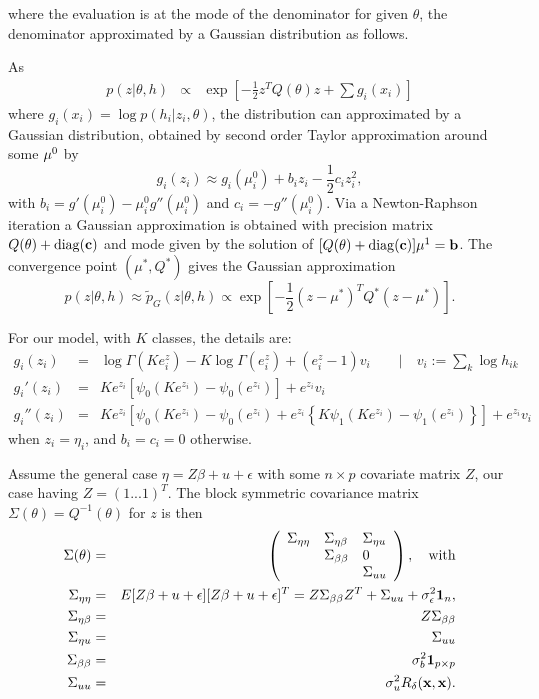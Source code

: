 \documentclass[10pt, onecolumn]{article}
\newcommand{\x}{z}
\newcommand{\y}{h}
\begin{document}
where the evaluation is at the mode of the denominator for given $\theta$, the denominator approximated by a Gaussian distribution as follows.

As
\begin{eqnarray}
p(\x | \theta, \y)&\propto& \exp \left[-\frac{1}{2}\x^T Q(\theta)\x + \sum g_i(x_i) \right]
\end{eqnarray}
where $g_i(x_i)=\log p(h_i|\x_i,\theta)$, the distribution can approximated by a Gaussian distribution, obtained by second order Taylor approximation around some $\bold\mu^0$ by
\[
g_i(\x_i)\approx g_i(\mu_i^0) + b_i \x_i - \frac{1}{2}c_i \x_i^2,
\]
with $b_i = g'(\mu_i^0)- \mu_i^0 g''(\mu_i^0)$ and $c_i=-g''(\mu_i^0)$. Via a Newton-Raphson iteration a Gaussian approximation is obtained with precision matrix $Q(\theta)+\mathrm{diag}(\bold c)$ and mode given by the solution of $[Q(\theta) + \mathrm{diag}(\bold c)]\bold\mu^1=\bold b$. 
The convergence point $(\mu^*, Q^*)$ gives the Gaussian approximation
\begin{equation}
p(\x|\theta, \y)\approx \tilde p_G(\x|\theta, \y) \propto \exp \left[-\frac{1}{2}(\x-\mu^*)^T Q^*(\x-\mu^*)\right].
\end{equation}

For our model, with $K$ classes, the details are:
\begin{eqnarray}
g_i(\x_i) &=& \log \Gamma(Ke^\x_i) - K\log \Gamma(e^\x_i) +(e^\x_i - 1) v_i \qquad |\quad  v_i := \sum_k \log h_{ik}\\
g_i'(\x_i) &=& Ke^{\x_i}\left[\psi_0(Ke^{\x_i})-\psi_0(e^{\x_i})\right]+e^{\x_i} v_i\\
g_i''(\x_i)&=& Ke^{\x_i}\left[\psi_0(Ke^{\x_i})-\psi_0(e^{\x_i}) + e^{\x_i}\left\{K\psi_1(Ke^{\x_i})-\psi_1(e^{\x_i})\right\}\right] + e^{\x_i}v_i
\end{eqnarray}
when $\x_i=\eta_i$, and $b_i=c_i=0$ otherwise. 

Assume the general case $\eta=Z\beta + u + \epsilon$ with some $n\times p$ covariate matrix $Z$, our case having $Z=(1...1)^T$. The block symmetric covariance matrix $\Sigma(\theta)=Q^{-1}(\theta)$ for $\x$ is then
\begin{eqnarray}
\Sigma(\theta) &=& \left(\begin{array}{lll} \Sigma_{\eta\eta} & \Sigma_{\eta\beta} & \Sigma_{\eta u}\\  & \Sigma_{\beta\beta}& 0 \\
& & \Sigma_{uu} \end{array}\right), \quad\mathrm{with}\\
\Sigma_{\eta\eta} &=& E[Z\beta+u+\epsilon][Z\beta+u+\epsilon]^T = Z\Sigma_{\beta\beta}Z^T + \Sigma_{uu} + \sigma_\epsilon^2 \bold 1_{n}, \\
\Sigma_{\eta\beta} &=& Z\Sigma_{\beta\beta}\\
\Sigma_{\eta u}&=&\Sigma_{uu} \\
\Sigma_{\beta\beta}&=&\sigma^2_b \bold 1_{p\times p}\\
\Sigma_{uu} &=& \sigma_u^2 R_\delta(\bold x, \bold x).
\end{eqnarray}
\end{document}
